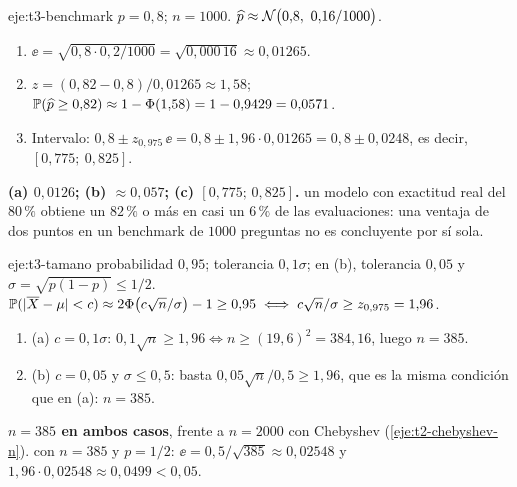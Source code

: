 \begin{solucion}{eje:t3-benchmark}
\datos $p=0{,}8$; $n=1000$.
\planteamiento $\widehat p\approx\Nor\bigl(0{,}8,\ 0{,}16/1000\bigr)$.
\pasos
\begin{enumerate}[label=\arabic*.]
  \item $\ee=\sqrt{0{,}8\cdot0{,}2/1000}=\sqrt{0{,}000\,16}\approx0{,}01265$.
  \item $z=(0{,}82-0{,}8)/0{,}01265\approx1{,}58$; $\mathbb{P}(\widehat p\ge0{,}82)\approx1-\Phi(1{,}58)=1-0{,}9429=0{,}0571$.
  \item Intervalo: $0{,}8\pm z_{0{,}975}\,\ee=0{,}8\pm1{,}96\cdot0{,}01265=0{,}8\pm0{,}0248$, es decir, $[0{,}775;\allowbreak\ 0{,}825]$.
\end{enumerate}
\resultado \textbf{(a) $0{,}0126$; (b) $\approx0{,}057$; (c) $[0{,}775;\allowbreak\,0{,}825]$.}
\comprobacion un modelo con exactitud real del $80\,\%$ obtiene un $82\,\%$ o más en casi un $6\,\%$ de las evaluaciones: una ventaja de dos puntos en un benchmark de $1000$ preguntas no es concluyente por sí sola.
\end{solucion}

\begin{solucion}{eje:t3-tamano}
\datos probabilidad $0{,}95$; tolerancia $0{,}1\sigma$; en (b), tolerancia $0{,}05$ y $\sigma=\sqrt{p(1-p)}\le1/2$.
\planteamiento $\mathbb{P}(\lvert\overline{X}-\mu\rvert<c)\approx2\Phi\bigl(c\sqrt n/\sigma\bigr)-1\ge0{,}95\iff c\sqrt n/\sigma\ge z_{0{,}975}=1{,}96$.
\pasos
\begin{enumerate}[label=\arabic*.]
  \item (a) $c=0{,}1\sigma$: $0{,}1\sqrt n\ge1{,}96\iff n\ge(19{,}6)^{2}=384{,}16$, luego $n=385$.
  \item (b) $c=0{,}05$ y $\sigma\le0{,}5$: basta $0{,}05\sqrt n/0{,}5\ge1{,}96$, que es la misma condición que en (a): $n=385$.
\end{enumerate}
\resultado \textbf{$n=385$ en ambos casos}, frente a $n=2000$ con Chebyshev (\cref{eje:t2-chebyshev-n}).
\comprobacion con $n=385$ y $p=1/2$: $\ee=0{,}5/\sqrt{385}\approx0{,}02548$ y $1{,}96\cdot0{,}02548\approx0{,}0499<0{,}05$.
\end{solucion}

